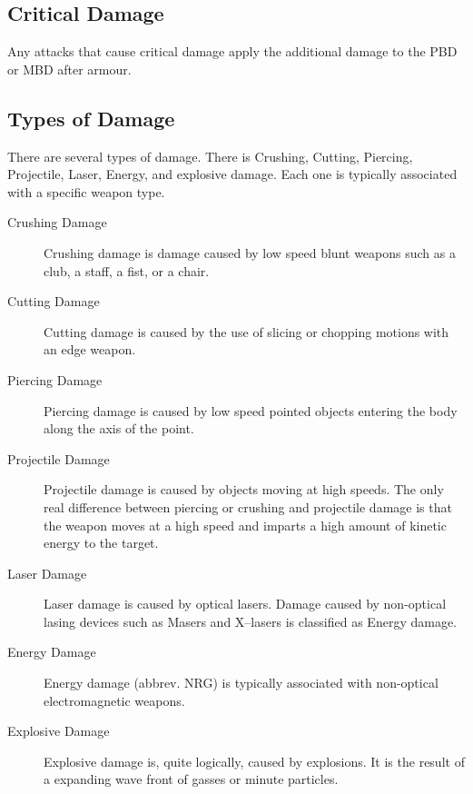 \subsection{Critical Damage}

Any attacks that cause critical damage apply the additional damage to
the PBD or MBD after armour.

\subsection{Types of Damage}

There are several types of damage. There is Crushing, Cutting,
Piercing, Projectile, Laser, Energy, and explosive damage. Each one
is typically associated with a specific weapon type.

\begin{description}
	\item[Crushing Damage]
	Crushing damage is damage caused by low speed blunt weapons such as
	a club, a staff, a fist, or a chair.

	\item[Cutting Damage]
	Cutting damage is caused by the use of slicing or chopping motions
	with an edge weapon.

	\item[Piercing Damage]
	Piercing damage is caused by low speed pointed objects entering the
	body along the axis of the point.

	\item[Projectile Damage]
	Projectile damage is caused by objects moving at high speeds. The
	only real difference between piercing or crushing and projectile
	damage is that the weapon moves at a high speed and imparts a
	high amount of kinetic energy to the target.

	\item[Laser Damage]
	Laser damage is caused by optical lasers. Damage caused by
	non-optical lasing devices such as Masers and X--lasers is classified
	as Energy damage.

	\item[Energy Damage]
	Energy damage (abbrev. NRG) is typically associated with non-optical
	electromagnetic weapons.

	\item[Explosive Damage]
	Explosive damage is, quite logically, caused by explosions. It is
	the result of a expanding wave front of gasses or minute particles.

\end{description}

